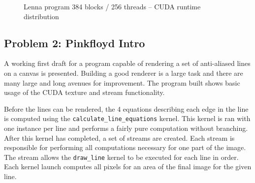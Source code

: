 \begin{enumerate}
\begin{figure}
\def\angle{0}
\def\radius{3}
\def\cyclelist{{"orange","blue","red","green","purple","yellow"}}
\newcount\cyclecount {}
\newcount\ind {}
\caption{Lenna program 384 blocks / 256 threads -- CUDA runtime distribution}
\label{figure:lenna_cuda_pie}
\end{figure}

\end{enumerate}

\subsection*{Problem 2: Pinkfloyd Intro}

A working first draft for a program capable of rendering a set of anti-aliased lines on a canvas is presented. Building a good renderer is a large task and there are many large and long avenues for improvement. The program built shows basic usage of the \ac{CUDA} texture and stream functionality.

Before the lines can be rendered, the 4 equations describing each edge in the line is computed using the \texttt{calculate\_line\_equations} kernel. This kernel is ran with one instance per line and performs a fairly pure computation without branching. After this kernel has completed, a set of streams are created. Each stream is responsible for performing all computations necessary for one part of the image. The stream allows the \texttt{draw\_line} kernel to be executed for each line in order. Each kernel launch computes all pixels for an area of the final image for the given line.

